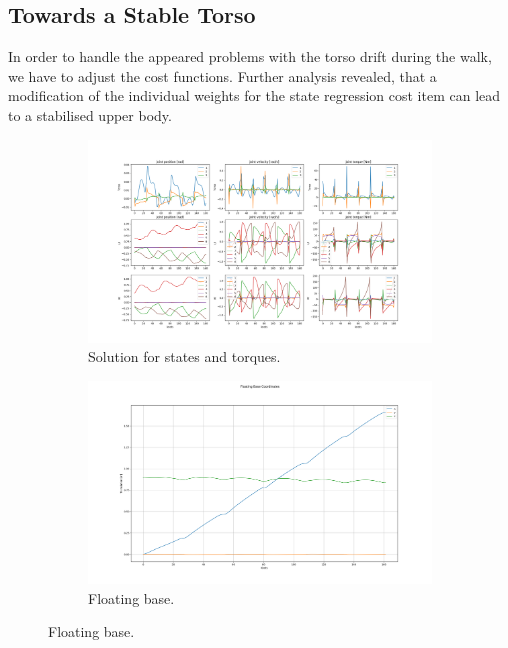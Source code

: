 \subsection{Towards a Stable Torso}
In order to handle the appeared problems with the torso drift during the walk, we have to adjust the cost functions. Further analysis revealed, that a modification of the individual weights for the state regression cost item can lead to a stabilised upper body.
\begin{figure}[h!]
\begin{subfigure}{1\textwidth}
 	 \centering
	 \includegraphics[width=1\linewidth]{Media/Crocoddyl/RH5Torso/FixTorsoFalling/RH5TorsoGait_FixFalling_Solution.png}
 	 \caption{Solution for states and torques.}
\end{subfigure}
\begin{subfigure}{1\textwidth}
  	\centering
  	\includegraphics[width=1\linewidth]{Media/Crocoddyl/RH5Torso/FixTorsoFalling/RH5TorsoGait_FixFalling_BaseCoord.png}
  	\caption{Floating base.}
\end{subfigure}
\end{figure}
